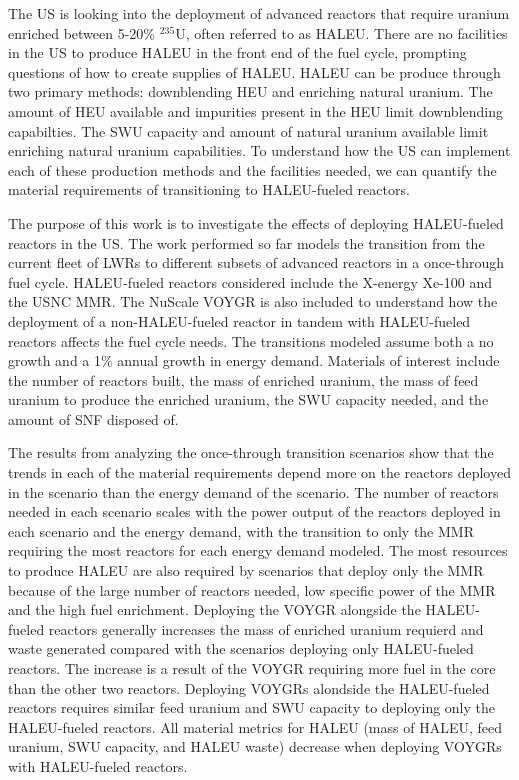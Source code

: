 The US is looking into the deployment of advanced reactors that 
require uranium enriched between 5-20\% $^{235}$U, often referred to 
as \gls{HALEU}. There are no facilities 
in the US to produce \gls{HALEU} in the front end of the fuel cycle, 
prompting questions of how to create supplies of \gls{HALEU}. 
\gls{HALEU} can be produce through two primary methods: downblending 
\gls{HEU} and enriching natural uranium. The amount of \gls{HEU} available 
and impurities present in the \gls{HEU} limit downblending capabilties.
The \gls{SWU} capacity and amount of natural uranium available limit 
enriching natural uranium capabilities. To understand how the US can 
implement each of these production 
methods and the facilities needed, we can quantify the 
material requirements of transitioning to \gls{HALEU}-fueled 
reactors. 

The purpose of this work is to investigate the effects of deploying 
\gls{HALEU}-fueled reactors in the US. 
The work performed so far models the transition from the
current fleet of \glspl{LWR} to different subsets of advanced reactors
in a once-through fuel cycle. 
\gls{HALEU}-fueled reactors considered include the X-energy Xe-100 and 
the \gls{USNC} \gls{MMR}. The NuScale VOYGR is also included to understand 
how the deployment of a non-\gls{HALEU}-fueled reactor in tandem with 
\gls{HALEU}-fueled reactors affects the fuel cycle needs. The 
transitions modeled assume both a no growth and a 1\% 
annual growth in energy demand. Materials of interest include the 
number of reactors built, the mass of enriched uranium, the mass 
of feed uranium to produce the enriched uranium, the \gls{SWU} 
capacity needed, and the amount of \gls{SNF} disposed of. 

The results from analyzing the once-through transition scenarios show 
that the trends in each of the material requirements depend more on the 
reactors deployed in the scenario than the energy 
demand of the scenario. The number of reactors needed in each scenario 
scales with the power output of the reactors deployed in each scenario 
and the energy demand, 
with the transition to only the \gls{MMR} requiring the most reactors for 
each energy demand modeled. The most resources to produce 
\gls{HALEU} are also required by scenarios that deploy only the \gls{MMR}
because of the large number of reactors needed, low specific power of the 
\gls{MMR} and the high fuel enrichment. Deploying the VOYGR 
alongside the \gls{HALEU}-fueled reactors generally increases the 
mass of enriched uranium requierd and waste generated compared with the 
scenarios deploying 
only \gls{HALEU}-fueled reactors. The increase is a result of the 
VOYGR requiring more fuel in the core than the other two reactors. 
Deploying VOYGRs alondside the \gls{HALEU}-fueled reactors requires similar 
feed uranium and \gls{SWU} capacity to deploying only the \gls{HALEU}-fueled 
reactors. All material metrics for \gls{HALEU} 
(mass of \gls{HALEU}, feed uranium, \gls{SWU} capacity, and \gls{HALEU} 
waste) decrease when deploying VOYGRs with \gls{HALEU}-fueled reactors.

